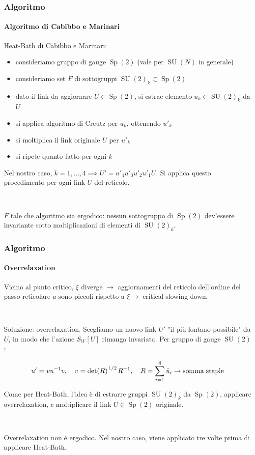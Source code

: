 \documentclass{beamer}
\newcommand{\SU}{\operatorname{SU}}
\newcommand{\Sp}{\operatorname{Sp}}
\begin{document}
\begin{frame}
	\frametitle{Algoritmo}
	\framesubtitle{Algoritmo di Cabibbo e Marinari}

	\alert{Heat-Bath di Cabibbo e Marinari}:

	\begin{itemize}
		\item consideriamo gruppo di gauge $\Sp(2)$ (vale per $\SU(N)$ in generale)
		\item consideriamo set $F$ di sottogruppi $\SU(2)_k \subset \Sp(2)$
		\item dato il link da aggiornare $U \in \Sp(2)$, si estrae elemento $u_k \in \SU(2)_k$ da $U$
		\item si applica algoritmo di Creutz per $u_k$, ottenendo $u'_k$
		\item si moltiplica il link originale $U$ per $u'_k$
		\item si ripete quanto fatto per ogni $k$
	\end{itemize}

	Nel nostro caso, $k = 1,\dots,4 \implies U' = u'_4 u'_3 u'_2 u'_1 U$. Si applica questo procedimento per ogni link $U$
	del reticolo. 

	\

	$F$ tale che algoritmo sia \alert{ergodico}: nessun sottogruppo di $\Sp(2)$ dev'essere invariante sotto 
	moltiplicazioni di elementi di $\SU(2)_k$.

\end{frame}

\begin{frame}
	\frametitle{Algoritmo}
	\framesubtitle{Overrelaxation}

	Vicino al punto critico, $\xi$ diverge $\rightarrow$ aggiornamenti del reticolo dell'ordine del passo reticolare $a$
	sono piccoli rispetto a $\xi \rightarrow$ \alert{critical slowing down}.
	
	\

	Soluzione: \alert{overrelaxation}. Scegliamo un nuovo link $U'$ "il più lontano possibile" da $U$, in modo che 
	l'azione $S_W[U]$ rimanga invariata. Per gruppo di gauge $\SU(2)$:

	\begin{equation*}
		u' = v u^{-1} v \qc v = \det(R)^{\flatfrac{1}{2}} R^{-1} \qc R = \sum_{i=1}^4 \tilde{u}_i \rightarrow \text{somma staple}
	\end{equation*}

	Come per Heat-Bath, l'idea è di estrarre gruppi $\SU(2)_k$ da $\Sp(2)$, applicare overrelaxation, e moltiplicare
	il link $U \in \Sp(2)$ originale.

	\

	\alert{Overrelaxation non è ergodico}. Nel nostro caso, viene applicato tre volte prima di applicare Heat-Bath.

\end{frame}
\end{document}
